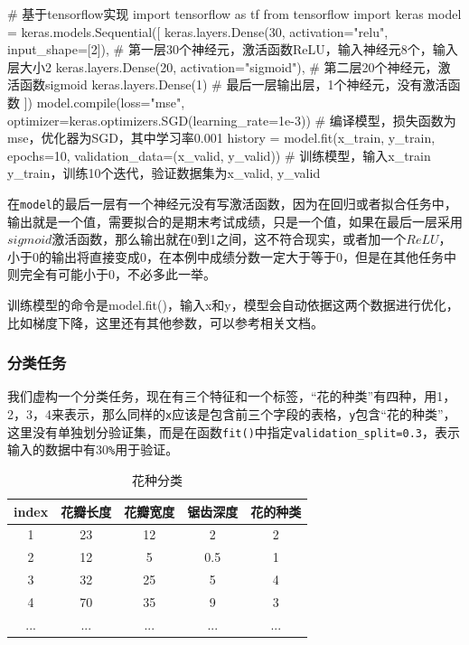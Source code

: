 \documentclass[a5paper, 11pt, openany]{book}
\begin{document}
\begin{python} \label{回归任务代码}
# 基于tensorflow实现
import tensorflow as tf
from tensorflow import keras
model = keras.models.Sequential([
    keras.layers.Dense(30, activation="relu", input_shape=[2]),
    # 第一层30个神经元，激活函数ReLU，输入神经元8个，输入层大小2
    keras.layers.Dense(20, activation="sigmoid"),
    # 第二层20个神经元，激活函数sigmoid
    keras.layers.Dense(1)
    # 最后一层输出层，1个神经元，没有激活函数
])
model.compile(loss="mse", optimizer=keras.optimizers.SGD(learning_rate=1e-3))
# 编译模型，损失函数为mse，优化器为SGD，其中学习率0.001
history = model.fit(x_train, y_train, epochs=10,
                    validation_data=(x_valid, y_valid))
# 训练模型，输入x_train y_train，训练10个迭代，验证数据集为x_valid, y_valid
\end{python}

在\verb|model|的最后一层有一个神经元没有写激活函数，因为在回归或者拟合任务中，输出就是一个值，需要拟合的是期末考试成绩，只是一个值，如果在最后一层采用$sigmoid$激活函数，那么输出就在0到1之间，这不符合现实，或者加一个$ReLU$，小于0的输出将直接变成0，在本例中成绩分数一定大于等于0，但是在其他任务中则完全有可能小于0，不必多此一举。

训练模型的命令是model.fit()，输入x和y，模型会自动依据这两个数据进行优化，比如梯度下降，这里还有其他参数，可以参考相关文档。

\subsubsection{分类任务}\label{分类任务}

我们虚构一个分类任务，现在有三个特征和一个标签，“花的种类”有四种，用1，2，3，4来表示，那么同样的\verb|x|应该是包含前三个字段的表格，\verb|y|包含“花的种类”，这里没有单独划分验证集，而是在函数\verb|fit()|中指定\verb|validation_split=0.3|，表示输入的数据中有30\verb|%|用于验证。

\begin{table}[ht]
    \centering
    \begin{tabular}{c c c c c}
      index & 花瓣长度 & 花瓣宽度 & 锯齿深度 & 花的种类  \\ \hline
         1  & 23     &   12     &  2      &   2     \\ 
         2  & 12     &   5      &  0.5    &   1     \\ 
         3  & 32     &   25     &  5      &   4     \\
         4  & 70     &   35     &  9      &   3     \\
         ...&  ...   &   ...    &  ...    &  ...
    \end{tabular}
    \caption{花种分类}
    \label{table2}
\end{table}
\end{document}

